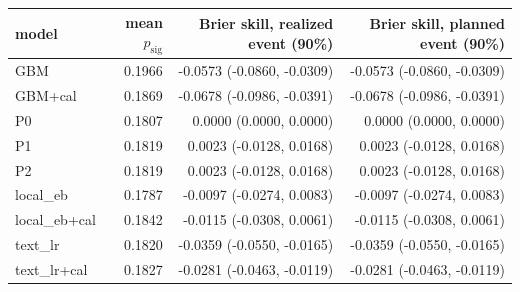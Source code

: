 \begin{tabular}{lrrr}
\toprule
model & mean $p_{\mathrm{sig}}$ & Brier skill, realized event (90\%) & Brier skill, planned event (90\%) \\
\midrule
GBM & 0.1966 & -0.0573 (-0.0860, -0.0309) & -0.0573 (-0.0860, -0.0309) \\
GBM+cal & 0.1869 & -0.0678 (-0.0986, -0.0391) & -0.0678 (-0.0986, -0.0391) \\
P0 & 0.1807 & 0.0000 (0.0000, 0.0000) & 0.0000 (0.0000, 0.0000) \\
P1 & 0.1819 & 0.0023 (-0.0128, 0.0168) & 0.0023 (-0.0128, 0.0168) \\
P2 & 0.1819 & 0.0023 (-0.0128, 0.0168) & 0.0023 (-0.0128, 0.0168) \\
local\_eb & 0.1787 & -0.0097 (-0.0274, 0.0083) & -0.0097 (-0.0274, 0.0083) \\
local\_eb+cal & 0.1842 & -0.0115 (-0.0308, 0.0061) & -0.0115 (-0.0308, 0.0061) \\
text\_lr & 0.1820 & -0.0359 (-0.0550, -0.0165) & -0.0359 (-0.0550, -0.0165) \\
text\_lr+cal & 0.1827 & -0.0281 (-0.0463, -0.0119) & -0.0281 (-0.0463, -0.0119) \\
\bottomrule
\end{tabular}
